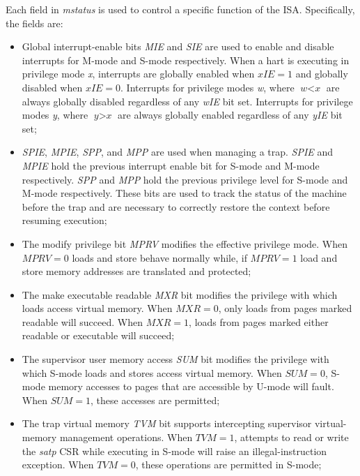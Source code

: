 Each field in \textit{mstatus} is used to control a specific function of the ISA.
Specifically, the fields are:
\begin{itemize}
  \item Global interrupt-enable bits \textit{MIE} and \textit{SIE} are used to enable
    and disable interrupts for M-mode and S-mode respectively. When a hart is
    executing in privilege mode \textit{x}, interrupts are globally enabled when
    $\textit{xIE}= 1$ and globally disabled when $\textit{xIE}= 0$. Interrupts for
    privilege modes \textit{w}, where $\textit{w}< \textit{x}$ are always globally
    disabled regardless of any \textit{wIE} bit set. Interrupts for privilege modes
    \textit{y}, where $\textit{y}> \textit{x}$ are always globally enabled regardless
    of any \textit{yIE} bit set;

  \item \textit{SPIE}, \textit{MPIE}, \textit{SPP}, and \textit{MPP} are used
    when managing a trap. \textit{SPIE} and \textit{MPIE} hold the previous interrupt
    enable bit for S-mode and M-mode respectively. \textit{SPP} and \textit{MPP}
    hold the previous privilege level for S-mode and M-mode respectively. These bits
    are used to track the status of the machine before the trap and are necessary
    to correctly restore the context before resuming execution;

  \item The modify privilege bit \textit{MPRV} modifies the effective privilege
    mode. When $\textit{MPRV}= 0$ loads and store behave normally while, if
    $\textit{MPRV}= 1$ load and store memory addresses are translated and
    protected;

  \item The make executable readable \textit{MXR} bit modifies the privilege
    with which loads access virtual memory. When $\textit{MXR}=0$, only loads
    from pages marked readable will succeed. When $\textit{MXR}=1$, loads from
    pages marked either readable or executable will succeed;

  \item The supervisor user memory access \textit{SUM} bit modifies the
    privilege with which S-mode loads and stores access virtual memory. When $\textit
    {SUM}=0$, S-mode memory accesses to pages that are accessible by U-mode will
    fault. When $\textit{SUM}=1$, these accesses are permitted;

  \item The trap virtual memory \textit{TVM} bit supports intercepting
    supervisor virtual-memory management operations. When $\textit{TVM}=1$,
    attempts to read or write the \textit{satp} CSR while executing in S-mode will
    raise an illegal-instruction exception. When $\textit{TVM}=0$, these operations
    are permitted in S-mode;


\end{itemize}
